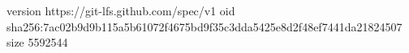 version https://git-lfs.github.com/spec/v1
oid sha256:7ac02b9d9b115a5b61072f4675bd9f35c3dda5425e8d2f48ef7441da21824507
size 5592544
